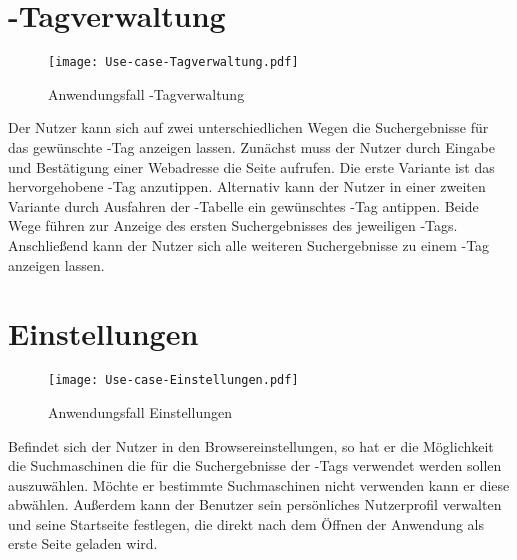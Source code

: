 \section{\SEARCH-Tagverwaltung}
\begin{figure}[htb]
\centering
\texttt{[image: Use-case-Tagverwaltung.pdf]}
	\caption{Anwendungsfall \glqq \SEARCH-Tagverwaltung\grqq}
\end{figure}
Der Nutzer kann sich auf zwei unterschiedlichen Wegen die Suchergebnisse für das gewünschte \SEARCH-Tag anzeigen lassen. Zunächst muss der Nutzer durch Eingabe und Bestätigung einer Webadresse die Seite aufrufen. Die erste Variante ist das hervorgehobene \SEARCH-Tag anzutippen. Alternativ kann der Nutzer in einer zweiten Variante durch Ausfahren der \SEARCH-Tabelle ein gewünschtes \SEARCH-Tag antippen. Beide Wege führen zur Anzeige des ersten Suchergebnisses des jeweiligen \SEARCH-Tags. Anschließend kann der Nutzer sich alle weiteren Suchergebnisse zu einem \SEARCH-Tag anzeigen lassen.
\pagebreak
\section{Einstellungen}
\begin{figure}[htb]
\centering
\texttt{[image: Use-case-Einstellungen.pdf]} %
	\caption{Anwendungsfall \glqq Einstellungen\grqq\xspace}
\end{figure}
Befindet sich der Nutzer in den Browsereinstellungen, so hat er die Möglichkeit die Suchmaschinen die für die Suchergebnisse der \SEARCH-Tags verwendet werden sollen auszuwählen. Möchte er bestimmte Suchmaschinen nicht verwenden kann er diese abwählen. Außerdem kann der Benutzer sein persönliches Nutzerprofil verwalten und seine Startseite festlegen, die direkt nach dem Öffnen der Anwendung als erste Seite geladen wird.
